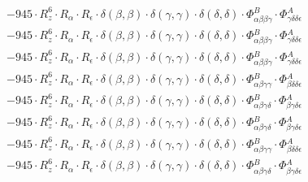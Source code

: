 \documentclass{article}
\begin{document}
\begin{subequations}
\begin{gather}
\begin{array}{c}
 \\[0.2em] 		 - 945 \cdot R_{z}^{6} \cdot R_{\alpha{}} \cdot R_{\epsilon{}} \cdot \delta{}\left(\beta{}, \beta{}\right) \cdot \delta{}\left(\gamma{}, \gamma{}\right) \cdot \delta{}\left(\delta{}, \delta{}\right) \cdot \Phi{}^{B}_{\alpha{}\beta{}\beta{}\gamma{}} \cdot \Phi{}^{A}_{\gamma{}\delta{}\delta{}\epsilon{}} 
 \\[0.2em] 		 - 945 \cdot R_{z}^{6} \cdot R_{\alpha{}} \cdot R_{\epsilon{}} \cdot \delta{}\left(\beta{}, \beta{}\right) \cdot \delta{}\left(\gamma{}, \gamma{}\right) \cdot \delta{}\left(\delta{}, \delta{}\right) \cdot \Phi{}^{B}_{\alpha{}\beta{}\beta{}\gamma{}} \cdot \Phi{}^{A}_{\gamma{}\delta{}\delta{}\epsilon{}} 
 \\[0.2em] 		 - 945 \cdot R_{z}^{6} \cdot R_{\alpha{}} \cdot R_{\epsilon{}} \cdot \delta{}\left(\beta{}, \beta{}\right) \cdot \delta{}\left(\gamma{}, \gamma{}\right) \cdot \delta{}\left(\delta{}, \delta{}\right) \cdot \Phi{}^{B}_{\alpha{}\beta{}\beta{}\gamma{}} \cdot \Phi{}^{A}_{\gamma{}\delta{}\delta{}\epsilon{}} 
 \\[0.2em] 		 - 945 \cdot R_{z}^{6} \cdot R_{\alpha{}} \cdot R_{\epsilon{}} \cdot \delta{}\left(\beta{}, \beta{}\right) \cdot \delta{}\left(\gamma{}, \gamma{}\right) \cdot \delta{}\left(\delta{}, \delta{}\right) \cdot \Phi{}^{B}_{\alpha{}\beta{}\gamma{}\gamma{}} \cdot \Phi{}^{A}_{\beta{}\delta{}\delta{}\epsilon{}} 
 \\[0.2em] 		 - 945 \cdot R_{z}^{6} \cdot R_{\alpha{}} \cdot R_{\epsilon{}} \cdot \delta{}\left(\beta{}, \beta{}\right) \cdot \delta{}\left(\gamma{}, \gamma{}\right) \cdot \delta{}\left(\delta{}, \delta{}\right) \cdot \Phi{}^{B}_{\alpha{}\beta{}\gamma{}\delta{}} \cdot \Phi{}^{A}_{\beta{}\gamma{}\delta{}\epsilon{}} 
 \\[0.2em] 		 - 945 \cdot R_{z}^{6} \cdot R_{\alpha{}} \cdot R_{\epsilon{}} \cdot \delta{}\left(\beta{}, \beta{}\right) \cdot \delta{}\left(\gamma{}, \gamma{}\right) \cdot \delta{}\left(\delta{}, \delta{}\right) \cdot \Phi{}^{B}_{\alpha{}\beta{}\gamma{}\delta{}} \cdot \Phi{}^{A}_{\beta{}\gamma{}\delta{}\epsilon{}} 
 \\[0.2em] 		 - 945 \cdot R_{z}^{6} \cdot R_{\alpha{}} \cdot R_{\epsilon{}} \cdot \delta{}\left(\beta{}, \beta{}\right) \cdot \delta{}\left(\gamma{}, \gamma{}\right) \cdot \delta{}\left(\delta{}, \delta{}\right) \cdot \Phi{}^{B}_{\alpha{}\beta{}\gamma{}\gamma{}} \cdot \Phi{}^{A}_{\beta{}\delta{}\delta{}\epsilon{}} 
 \\[0.2em] 		 - 945 \cdot R_{z}^{6} \cdot R_{\alpha{}} \cdot R_{\epsilon{}} \cdot \delta{}\left(\beta{}, \beta{}\right) \cdot \delta{}\left(\gamma{}, \gamma{}\right) \cdot \delta{}\left(\delta{}, \delta{}\right) \cdot \Phi{}^{B}_{\alpha{}\beta{}\gamma{}\delta{}} \cdot \Phi{}^{A}_{\beta{}\gamma{}\delta{}\epsilon{}} 

\end{array}
\end{gather}
\end{subequations}
\end{document}
